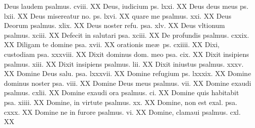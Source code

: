 \documentclass[a5paper,10pt]{book}
\def\ae{æ}
\begin{document}
\begin{multicols}{2}
\newline Deus laudem psalmus. cviii. \hfill XX
\newline Deus, iudicium ps. lxxi. \hfill XX
\newline Deus deus meus ps. lxii. \hfill XX
\newline Deus misereatur no. ps. lxvi. \hfill XX
\newline \indent quare me psalmus. xxi. \hfill XX
\newline Deus Deorum psalmus. xlix. \hfill XX
\newline Deus noster refu. psa. xlv. \hfill XX
\newline Deus vltionum psalmus. xciii. \hfill XX
\newline Defecit in salutari psa. xciii. \hfill XX
\newline De profundis psalmus. cxxix. \hfill XX
\newline Diligam te domine psa. xvii. \hfill XX
\newline \indent orationis me\ae \ ps. cxiiii. \hfill XX
\newline Dixi, custodiam psa. xxxviii. \hfill XX
\newline Dixit dominus dom. meo psa. cix. \hfill XX
\newline Dixit insipiens psalmus. xiii. \hfill XX
\newline Dixit insipiens psalmus. lii. \hfill XX
\newline Dixit iniustus psalmus. xxxv. \hfill XX
\newline Domine Deus salu. psa. lxxxvii. \hfill XX
\newline Domine refugium ps. lxxxix. \hfill XX
\newline Domine dominus noster psa. viii. \hfill XX
\newline Domine Deus meus psalmus. vii. \hfill XX
\newline Domine exaudi psalmus. cxlii. \hfill XX
\newline Domine exaudi ora psalmus. ci. \hfill XX
\newline Domine quis habitabit psa. xiiii. \hfill XX
\newline Domine, in virtute psalmus. xx. \hfill XX
\newline Domine, non est exal. psa. cxxx. \hfill XX
\newline Domine ne in furore psalmus. vi. \hfill XX
\newline Domine, clamaui psalmus. cxl. \hfill XX

\end{multicols}
\end{document}
